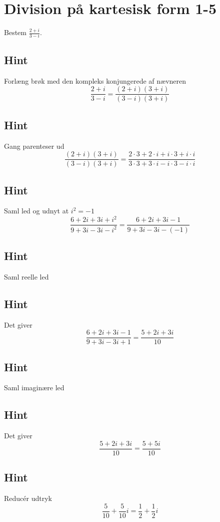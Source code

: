 \documentclass{article}
\newenvironment{exercise}[1]{\newpage\section{#1}}{}
\newcommand{\answerbox}[1]{\fbox{$#1$}}
\newcommand{\hint}{\subsection*{Hint}}
\begin{document}
\begin{exercise}{Division på kartesisk form 1-5}
	
	Bestem $\frac{2+i}{3-i}$.
	
	\answerbox{ \frac{1}{2}+\frac{1}{2}i }
	
	
	\hint 
	
	Forlæng brøk med den kompleks konjungerede af nævneren
	\[
	\frac{2+i}{3-i} = \frac{(2+i)(3+i)}{(3-i)(3+i)}
	\]
	
	\hint
	
	Gang parenteser ud
	\[
	\frac{(2+i)(3+i)}{(3-i)(3+i)} = \frac{2 \cdot 3 + 2 \cdot i + i \cdot 3 +i \cdot i}{3 \cdot 3 + 3 \cdot i -i \cdot 3 -i \cdot i}
	\]
	
	\hint 
	
	Saml led og udnyt at $i^2 = -1$
	\[
	\frac{6+2i+3i+i^2}{9 + 3i -3i -i^2} = \frac{6+2i+3i-1}{9 + 3i -3i -(-1)}
	\]
	
	\hint
	
	Saml reelle led
	
	\hint
	
	Det giver
	\[
	\frac{6+2i+3i-1}{9 + 3i -3i +1} = \frac{5 + 2i +3i}{10}
	\]
	
	\hint
	
	Saml imaginære led
	
	
	\hint
	
	Det giver 
	\[
	\frac{5 + 2i +3i}{10} = \frac{5+5i}{10}
	\]
	
	\hint
	
	Reducér udtryk
	\[
	\frac{5}{10}+\frac{5}{10}i = \frac{1}{2}+\frac{1}{2}i 
	\]
	
\end{exercise}

\newpage
\end{document}
